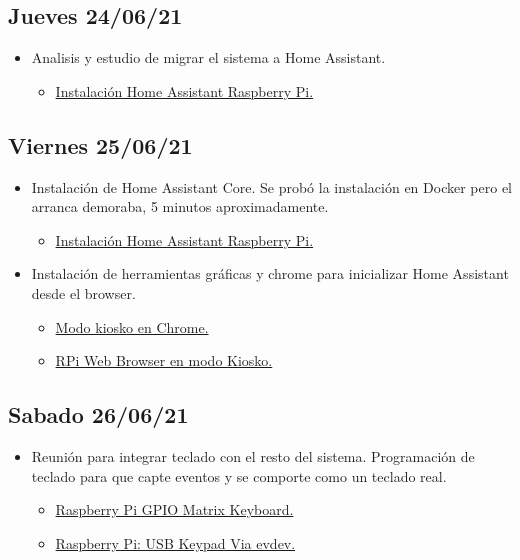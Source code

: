 \subsection*{Jueves 24/06/21}
    \begin{itemize}
        \item Analisis y estudio de migrar el sistema a Home Assistant.
        \begin{itemize}
            \item \href{https://www.home-assistant.io/installation/raspberrypi}{Instalación Home Assistant Raspberry Pi.}
        \end{itemize}
    \end{itemize}
 
\subsection*{Viernes 25/06/21}
    \begin{itemize}
        \item Instalación de Home Assistant Core. Se probó la instalación en Docker pero el arranca demoraba, 5 minutos aproximadamente. 
        \begin{itemize}
            \item \href{https://www.home-assistant.io/installation/raspberrypi}{Instalación Home Assistant Raspberry Pi.}
        \end{itemize}
        \item Instalación de herramientas gráficas y chrome para inicializar Home Assistant desde el browser.
        \begin{itemize}
            \item \href{https://sylvaindurand.org/launch-chromium-in-kiosk-mode/}{Modo kiosko en Chrome.}
            \item \href{https://die-antwort.eu/techblog/2017-12-setup-raspberry-pi-for-kiosk-mode/}{RPi Web Browser en modo Kiosko.}
        \end{itemize}
    \end{itemize}    

\subsection*{Sabado 26/06/21}
    \begin{itemize}
        \item Reunión para integrar teclado con el resto del sistema. Programación de teclado para que capte eventos y se comporte como un teclado real.
        \begin{itemize}
            \item \href{https://github.com/nutki/rpi-gpio-matrix-keyboard}{Raspberry Pi GPIO Matrix Keyboard.}
            \item \href{https://softsolder.com/2016/03/02/raspberry-pi-usb-keypad-via-evdev/}{Raspberry Pi: USB Keypad Via evdev.}
        \end{itemize}
    \end{itemize}

